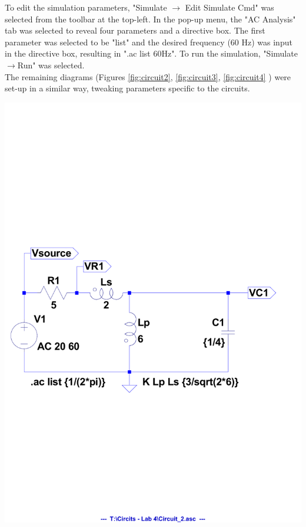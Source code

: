 \documentclass[journal]{IEEEtran}
\begin{document}
\noindent To edit the simulation parameters, "Simulate $\longrightarrow{}$ Edit Simulate Cmd" was selected from the toolbar at the top-left. In the pop-up menu, the "AC Analysis" tab was selected to reveal four parameters and a directive box. The first parameter was selected to be "list" and the desired frequency (60 Hz) was input in the directive box, resulting in ".ac list 60Hz". To run the simulation, "Simulate$\longrightarrow{}$Run" was selected.\\

\noindent The remaining diagrams (Figures \ref{fig:circuit2}, \ref{fig:circuit3}, \ref{fig:circuit4} ) were set-up in a similar way, tweaking parameters specific to the circuits. 

\begingroup
    \centering
    \medskip
    \includegraphics[clip, trim=0.0cm 9cm 0.0cm 9cm, width=\columnwidth]{images/labx_5.pdf}
    \label{fig:circuit2}
    \medskip
\endgroup
\end{document}
